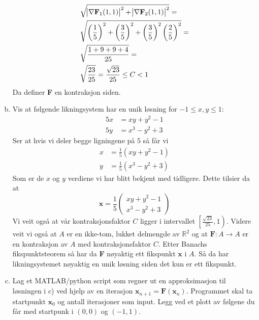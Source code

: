 \documentclass[a4paper,10pt,english]{article}
\begin{document}
\begin{enumerate}[a)]
			\begin{align*}
				&\sqrt{\abs{\nabla \mathbf{F}_1 (1,1)}^2 + \abs{\nabla \mathbf{F}_2 (1, 1)}^2} =\\
				&\sqrt{\left( \frac{1}{5} \right)^2 + \left( \frac{3}{5} \right)^2 + \left( \frac{3}{5} \right)^2 \left( \frac{2}{5} \right)^2} =\\
				&\sqrt{\frac{1+9+9+4}{25}}=\\
				&\sqrt{\frac{23}{25}} = \frac{\sqrt{23}}{25} \leq C  < 1
			\end{align*}
			Da definer \textbf{F} en kontraksjon siden.
		\item Vis at følgende likningsystem har en unik løsning for $-1 \leq x, y \leq 1$:
			\begin{align*}
				5x &= xy + y^2 -1\\
				5y &= x^3 -y^2 +3
			\end{align*}
			Ser at hvis vi deler begge ligningene på $5$ så får vi 
			\begin{align*}
				x &= \frac{1}{5} \left(xy + y^2 - 1 \right)\\
				y &= \frac{1}{5} \left( x^3 - y^2 + 3 \right) 
			\end{align*} 
			Som er de $x$ og $y$ verdiene vi har blitt bekjent med tidligere. Dette tilsier da at \[
			\mathbf{x} = \frac{1}{5} 
			\begin{pmatrix}
				xy + y^2 - 1\\
				x^3 - y^2 + 3
			\end{pmatrix}
			\] 
			Vi veit også at vår kontraksjonsfaktor $C$ ligger i intervallet $\left[ \frac{\sqrt{23}}{25}, 1 \right)$. Videre veit vi også at $A$ er en ikke-tom, lukket delmengde av $\mathbb{R}^2$ og at $\mathbf{F}: A \rightarrow A$ er en kontraksjon av $A$ med kontraksjonsfaktor $C$. Etter Banachs fikspunktsteorem så har da \textbf{F} nøyaktig ett fikspunkt $\mathbf{x}$ i $A$. Så da har likningsystemet nøyaktig en unik løsning siden det kun er ett fikspunkt.
		\item Lag et MATLAB/python script som regner ut en approksimasjon til løsningen i c) ved hjelp av en iterasjon $\mathbf{x}_{n+1} = \mathbf{F}(\mathbf{x}_n)$. Programmet skal ta startpunkt $\mathbf{x}_0$ og antall iterasjoner som input. Legg ved et plott av følgene du får med startpunk i $(0,0)$ og $(-1,1)$.
	\end{enumerate}
\end{document}
